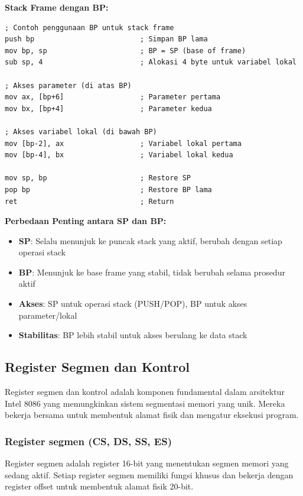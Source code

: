 \documentclass[../main.tex]{subfiles}
\begin{document}
\textbf{Stack Frame dengan BP:}
\begin{lstlisting}[language={[x86masm]Assembler}, caption=Stack Frame dengan Base Pointer, label=lst:stack-frame]
; Contoh penggunaan BP untuk stack frame
push bp                         ; Simpan BP lama
mov bp, sp                      ; BP = SP (base of frame)
sub sp, 4                       ; Alokasi 4 byte untuk variabel lokal

; Akses parameter (di atas BP)
mov ax, [bp+6]                  ; Parameter pertama
mov bx, [bp+4]                  ; Parameter kedua

; Akses variabel lokal (di bawah BP)
mov [bp-2], ax                  ; Variabel lokal pertama
mov [bp-4], bx                  ; Variabel lokal kedua

mov sp, bp                      ; Restore SP
pop bp                          ; Restore BP lama
ret                             ; Return
\end{lstlisting}


\textbf{Perbedaan Penting antara SP dan BP:}
\begin{itemize}
    \item \textbf{SP}: Selalu menunjuk ke puncak stack yang aktif, berubah dengan setiap operasi stack
    \item \textbf{BP}: Menunjuk ke base frame yang stabil, tidak berubah selama prosedur aktif
    \item \textbf{Akses}: SP untuk operasi stack (PUSH/POP), BP untuk akses parameter/lokal
    \item \textbf{Stabilitas}: BP lebih stabil untuk akses berulang ke data stack
\end{itemize}

\subsection{Register Segmen dan Kontrol}\label{subsec:arsitektur-segmen-kontrol}
Register segmen dan kontrol adalah komponen fundamental dalam arsitektur Intel 8086 yang memungkinkan sistem segmentasi memori yang unik. Mereka bekerja bersama untuk membentuk alamat fisik dan mengatur eksekusi program.

\subsubsection{Register segmen (CS, DS, SS, ES)}
Register segmen adalah register 16-bit yang menentukan segmen memori yang sedang aktif. Setiap register segmen memiliki fungsi khusus dan bekerja dengan register offset untuk membentuk alamat fisik 20-bit.
\end{document}
